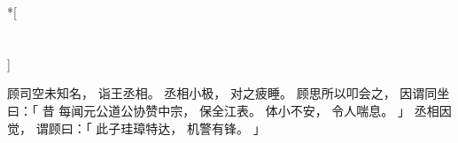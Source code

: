 
\switchcolumn[0]*[\section{}]

顾司空未知名，
诣王丞相。
丞相小极，
对之疲睡。
顾思所以叩会之，
因谓同坐曰：「
    昔
    每闻元公道公协赞中宗，
    保全江表。
    体小不安，
    令人喘息。
」
丞相因觉，
谓顾曰：「
    此子珪璋特达，
    机警有锋。
」

\switchcolumn



